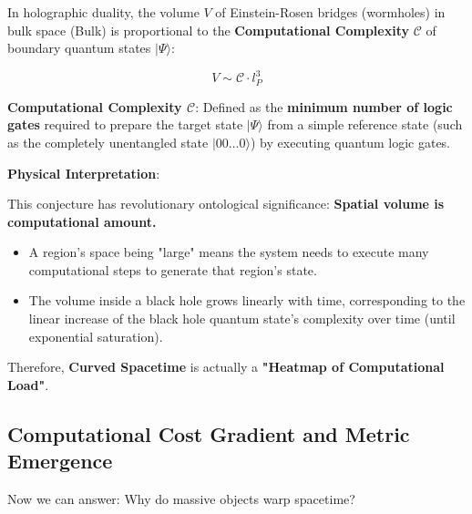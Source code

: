 \begin{conjecture}[CV Correspondence]
In holographic duality, the volume $V$ of Einstein-Rosen bridges (wormholes) in bulk space (Bulk) is proportional to the \textbf{Computational Complexity} $\mathcal{C}$ of boundary quantum states $|\Psi\rangle$:

\begin{equation}
V \sim \mathcal{C} \cdot l_P^3
\end{equation}

\textbf{Computational Complexity $\mathcal{C}$}: Defined as the \textbf{minimum number of logic gates} required to prepare the target state $|\Psi\rangle$ from a simple reference state (such as the completely unentangled state $|00\dots0\rangle$) by executing quantum logic gates.
\end{conjecture}

\textbf{Physical Interpretation}:

This conjecture has revolutionary ontological significance: \textbf{Spatial volume is computational amount.}

\begin{itemize}
\item A region's space being "large" means the system needs to execute many computational steps to generate that region's state.

\item The volume inside a black hole grows linearly with time, corresponding to the linear increase of the black hole quantum state's complexity over time (until exponential saturation).
\end{itemize}

Therefore, \textbf{Curved Spacetime} is actually a \textbf{"Heatmap of Computational Load"}.

\subsection{Computational Cost Gradient and Metric Emergence}

Now we can answer: Why do massive objects warp spacetime?

